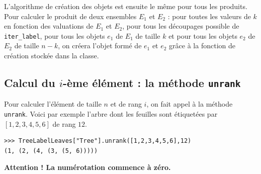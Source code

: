 \documentclass[11pt]{article}
\newcommand{\unrank}{\texttt{unrank}\xspace}
\begin{document}
L'algorithme de création des objets est ensuite le même pour tous les
produits.  Pour calculer le produit de deux ensembles $E_1$ et $E_2$ : pour
toutes les valeurs de $k$ en fonction des valuations de $E_1$ et $E_2$, pour
tous les découpages possible de \texttt{iter\_label}, pour tous les objets
$e_1$ de $E_1$ de taille $k$ et pour tous les objets $e_2$ de $E_2$ de taille
$n-k$, on créera l'objet formé de $e_1$ et $e_2$ grâce à la fonction de
création stockée dans la classe.



\subsection{Calcul du $i$-ème élément : la méthode \texttt{unrank}}

Pour calculer l'élément de taille $n$ et de rang $i$, on fait appel à la
méthode \unrank. Voici par exemple l'arbre dont les feuilles
sont étiquetées par $[1,2,3,4,5,6]$ de rang $12$.
\begin{verbatim}
>>> TreeLabelLeaves["Tree"].unrank([1,2,3,4,5,6],12)
(1, (2, (4, (3, (5, 6)))))
\end{verbatim}
\textbf{Attention ! La numérotation commence à zéro.}
\end{document}
